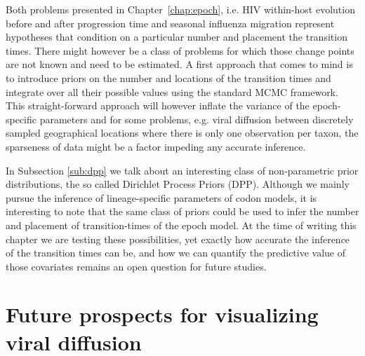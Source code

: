 Both problems presented in Chapter~\ref{chap:epoch}, i.e. HIV within-host evolution before and after progression time and seasonal influenza migration represent hypotheses that condition on a particular  number and placement the transition times.
There might however be a class of problems for which those change points are not known and need to be estimated.
A first approach that comes to mind is to introduce priors on the number and locations of the transition times and integrate over all their possible values using the standard MCMC framework.
This straight-forward approach will however inflate the variance of the epoch-specific parameters and for some problems, e.g. viral diffusion between discretely sampled geographical locations where there is only one observation per taxon, the sparseness of data might be a factor impeding any accurate inference.

In Subsection \ref{sub:dpp} we talk about an interesting class of non-parametric prior distributions, the so called Dirichlet Process Priors (DPP). 
Although we mainly pursue the inference of lineage-specific parameters of codon models, it is interesting to note that the same class of priors could be used to infer the number and placement of transition-times of the epoch model.
At the time of writing this chapter we are testing these possibilities, yet exactly how accurate the inference of the transition times can be, and how we can quantify the predictive value of those covariates remains an open question for future studies.

\section{Future prospects for visualizing viral diffusion}


